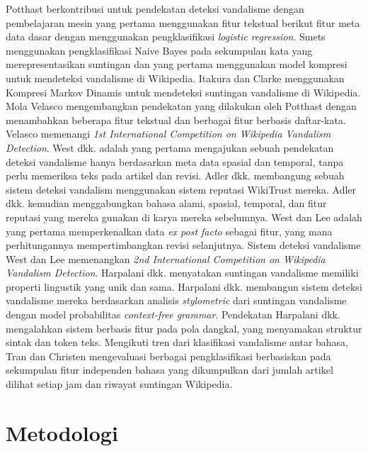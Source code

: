\documentclass[12pt,a4paper,titlepage]{article}
\begin{document}
Potthast \cite{potthast2008automatic} berkontribusi untuk pendekatan deteksi vandalisme dengan pembelajaran mesin yang pertama menggunakan fitur tekstual berikut fitur meta data dasar dengan menggunakan pengklasifikasi \textit{logistic regression}.
Smets \cite{smets08automaticvandalism} menggunakan pengklasifikasi Naive Bayes pada sekumpulan kata yang merepresentasikan suntingan dan yang pertama menggunakan model kompresi untuk mendeteksi vandalisme di Wikipedia.
Itakura dan Clarke \cite{itakura2009using} menggunakan Kompresi Markov Dinamis untuk mendeteksi suntingan vandalisme di Wikipedia.
Mola Velasco \cite{mola2012wikipedia} mengembangkan pendekatan yang dilakukan oleh Potthast \cite{potthast2008automatic} dengan menambahkan beberapa fitur tekstual dan berbagai fitur berbasis daftar-kata.
Velasco memenangi \textit{1st International Competition on Wikipedia Vandalism Detection}.
West dkk. \cite{west2011multilingual} adalah yang pertama mengajukan sebuah pendekatan deteksi vandalisme hanya berdasarkan meta data spasial dan temporal, tanpa perlu memeriksa teks pada artikel dan revisi.
Adler dkk. \cite{adler2010detecting} membangung sebuah sistem deteksi vandalism menggunakan sistem reputasi WikiTrust mereka.
Adler dkk. \cite{adler2011wikipedia} kemudian menggabungkan bahasa alami, spasial, temporal, dan fitur reputasi yang mereka gunakan di karya mereka sebelumnya.
West dan Lee \cite{west2011multilingual} adalah yang pertama memperkenalkan data \textit{ex post facto} sebagai fitur, yang mana perhitungannya mempertimbangkan revisi selanjutnya.
Sistem deteksi vandalisme West dan Lee memenangkan \textit{2nd International Competition on Wikipedia Vandalism Detection}.
Harpalani dkk. \cite{harpalani2011language} menyatakan suntingan vandalisme memiliki properti lingustik yang unik dan sama. Harpalani dkk. membangun sistem deteksi vandalisme mereka berdasarkan analisis \textit{stylometric} dari suntingan vandalisme dengan model probabilitas \textit{context-free grammar}.
Pendekatan Harpalani dkk. mengalahkan sistem berbasis fitur pada pola dangkal, yang menyamakan struktur sintak dan token teks.
Mengikuti tren dari klasifikasi vandalisme antar bahasa, Tran dan Christen \cite{tran2013cross} mengevaluasi berbagai pengklasifikasi berbasiskan pada sekumpulan fitur independen bahasa yang dikumpulkan dari jumlah artikel dilihat setiap jam dan riwayat suntingan Wikipedia.


\section{Metodologi}\label{sec:metodologi}
\end{document}

